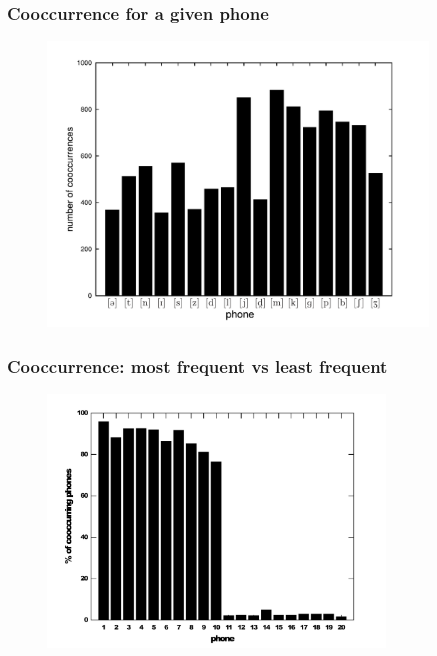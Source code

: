 \documentclass[notes]{beamer}
\begin{document}
\frame
{
  \frametitle{Cooccurrence for a given phone}
  \vspace{-0.5cm}
  \begin{figure}[h!]
  \centering
  \includegraphics[width=0.9\textwidth]{images/num_cooccurring_phones.pdf}
  \label{fig:numper_cooccurring_phones}
  \end{figure} 
}


\frame
{
  \frametitle{Cooccurrence: most frequent vs least frequent}
  \vspace{-0.5cm}
  \begin{figure}[h!]
  \centering
  \includegraphics[width=0.8\textwidth]{images/numper_cooccurring_phones_10.pdf}
  \label{fig:numper_cooccurring_phones_10}
  \end{figure} 
}
\end{document}
